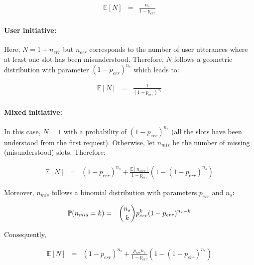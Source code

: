                      \begin{eqnarray}
                       \mathbb{E} [N] & = & \frac{n_s}{1-p_{err}}
                     \end{eqnarray}

                \paragraph{User initiative:} Here, $N = 1 + n_{err}$  but $n_{err}$ corresponds to the number of user utterances where at least one slot has been misunderstood. Therefore, $N$ follows a geometric distribution with parameter $(1-p_{err})^{n_s}$ which leads to:

                     \begin{eqnarray}
                       \mathbb{E} [N] & = & \frac{1}{(1-p_{err})^{n_s}}
                     \end{eqnarray}

                \paragraph{Mixed initiative:} In this case, $N=1$ with a probability of $(1-p_{err})^{n_s}$ (all the slots have been understood from the first request). Otherwise, let $n_{mis}$ be the number of missing (misunderstood) slots. Therefore:

                     \begin{eqnarray}
                       \mathbb{E} [N] & = & (1-p_{err})^{n_s} + \frac{\mathbb{E} [n_{mis}]}{1-p_{err}} (1 - (1-p_{err})^{n_s})
                     \end{eqnarray}

                     Moreover, $n_{mis}$ follows a binomial distribution with parameters $p_{err}$ and $n_s$:
										
											\begin{eqnarray}
												\mathbb{P} (n_{mis} = k) & = & \dbinom{n_s}{k} p_{err}^k (1-p_{err})^{n_s-k}
											\end{eqnarray}
										
										Consequently,

                     \begin{eqnarray}
                       \mathbb{E} [N] & = & (1-p_{err})^{n_s} + \frac{p_{err} n_s}{1-p_{err}} (1 - (1-p_{err})^{n_s})
                     \end{eqnarray}
										

